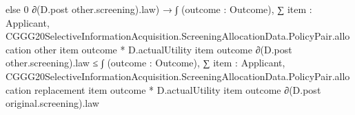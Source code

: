 \documentclass[10pt]{article}
\begin{document}
\begin{ReviewVerbatim}
                                                          else 0 ∂(D.post other.screening).law) →
                                          ∫ (outcome : Outcome),
                                              ∑ item : Applicant,
                                                CGGG20SelectiveInformationAcquisition.ScreeningAllocationData.PolicyPair.allocation
                                                    other item outcome *
                                                  D.actualUtility item outcome ∂(D.post other.screening).law ≤
                                            ∫ (outcome : Outcome),
                                              ∑ item : Applicant,
                                                CGGG20SelectiveInformationAcquisition.ScreeningAllocationData.PolicyPair.allocation
                                                    replacement item outcome *
                                                  D.actualUtility item outcome ∂(D.post original.screening).law
\end{ReviewVerbatim}
\end{document}
